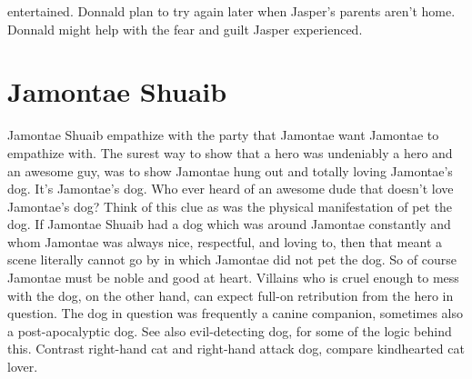 \documentclass[12pt]{book}
\begin{document}
entertained. Donnald plan to try again later when Jasper's parents aren't home. Donnald might help with the fear and guilt Jasper experienced.



\chapter{Jamontae Shuaib}

Jamontae Shuaib empathize with the party that Jamontae want Jamontae to empathize with. The surest way to show that a hero was undeniably a hero and an awesome guy, was to show Jamontae hung out and totally loving Jamontae's dog. It's Jamontae's dog. Who ever heard of an awesome dude that doesn't love Jamontae's dog? Think of this clue as was the physical manifestation of pet the dog. If Jamontae Shuaib had a dog which was around Jamontae constantly and whom Jamontae was always nice, respectful, and loving to, then that meant a scene literally cannot go by in which Jamontae did not pet the dog. So of course Jamontae must be noble and good at heart. Villains who is cruel enough to mess with the dog, on the other hand, can expect full-on retribution from the hero in question. The dog in question was frequently a canine companion, sometimes also a post-apocalyptic dog. See also evil-detecting dog, for some of the logic behind this. Contrast right-hand cat and right-hand attack dog, compare kindhearted cat lover.
\end{document}
